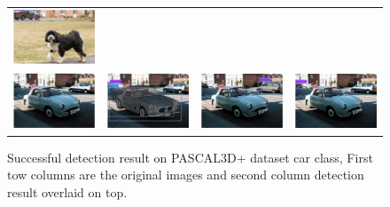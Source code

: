 \documentclass[10pt,twocolumn,letterpaper]{article}
\begin{document}
\begin{figure}[h]
\begin{tabular}{|cc|cc|}
  \includegraphics[width=0.24\linewidth]{supp/pas_car22b.png} \\
  \includegraphics[width=0.24\linewidth]{supp/pas_car18a.png} &
  \includegraphics[width=0.24\linewidth]{supp/pas_car18b.png} & 
  \includegraphics[width=0.24\linewidth]{supp/pas_car18c.png} &
  \includegraphics[width=0.24\linewidth]{supp/pas_car18d.png} \\
  \hline
  \end{tabular}
\caption{Successful detection result on PASCAL3D+ dataset car class, First tow columns are the original images and second column detection result overlaid on top. }
  \label{fig:pascal3d_car_good}
\end{figure}
\end{document}
